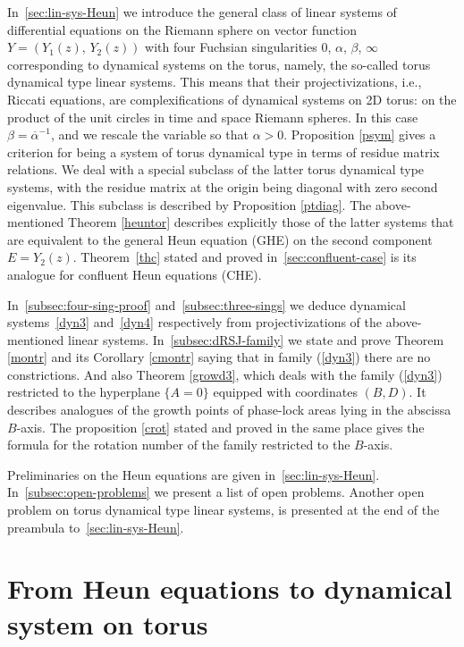 \documentclass[preprint,12pt]{elsarticle}
\theoremstyle{plain}
\def\a{\alpha}
\numberwithin{equation}{section}
\numberwithin{equation}{section}
\begin{document}
In~\autoref{sec:lin-sys-Heun} we introduce the general class of linear systems of differential equations on the Riemann sphere on vector function $Y=(Y_1(z),\,Y_2(z))$ with four Fuchsian singularities $0$, $\a$, $\beta$, $\infty$ corresponding to dynamical systems on the torus, namely, the so-called torus dynamical type linear systems. This means that their projectivizations, i.e., Riccati equations, are complexifications of dynamical systems on 2D torus: on the product of the unit circles in time and space Riemann spheres. In this case 
$\beta=\overline{\a}^{-1}$, and we rescale the variable so that $\a>0$. Proposition \ref{psym} gives a criterion for being a system of torus dynamical type in terms of residue matrix relations. We deal with a special subclass of the latter torus dynamical type systems, with the residue matrix at the origin being diagonal with zero second eigenvalue. This subclass is described by Proposition \ref{ptdiag}. The above-mentioned Theorem \ref{heuntor} describes explicitly those of the latter systems that are equivalent to the general Heun equation (GHE) on the second component
$E=Y_2(z)$. Theorem~\ref{thc} stated and proved in~\autoref{sec:confluent-case} is its analogue for confluent Heun equations (CHE). 

In~\autoref{subsec:four-sing-proof} and~\autoref{subsec:three-sings} we deduce dynamical systems~\eqref{dyn3} and~\eqref{dyn4} respectively from projectivizations of the above-mentioned linear systems. In~\autoref{subsec:dRSJ-family} we state and prove Theorem \ref{montr} and its Corollary \ref{cmontr} saying that in family (\ref{dyn3}) there are no constrictions. And also Theorem \ref{growd3}, which deals with the family (\ref{dyn3}) restricted to the hyperplane $\{A=0\}$ equipped with coordinates $(B,D)$. It describes analogues of the growth points of phase-lock areas lying in the abscissa $B$-axis. The proposition \ref{crot} stated and proved in the same place gives the formula for the rotation number of the family restricted to the $B$-axis. 

Preliminaries on the Heun equations are given in~\autoref{sec:lin-sys-Heun}. In~\autoref{subsec:open-problems} we present a list of open problems. Another open problem on torus dynamical type linear systems, is presented at the end of the preambula to~\autoref{sec:lin-sys-Heun}. 

 

\section{From Heun equations to dynamical system on torus}\label{sec:Heun-to-torus}
\end{document}

